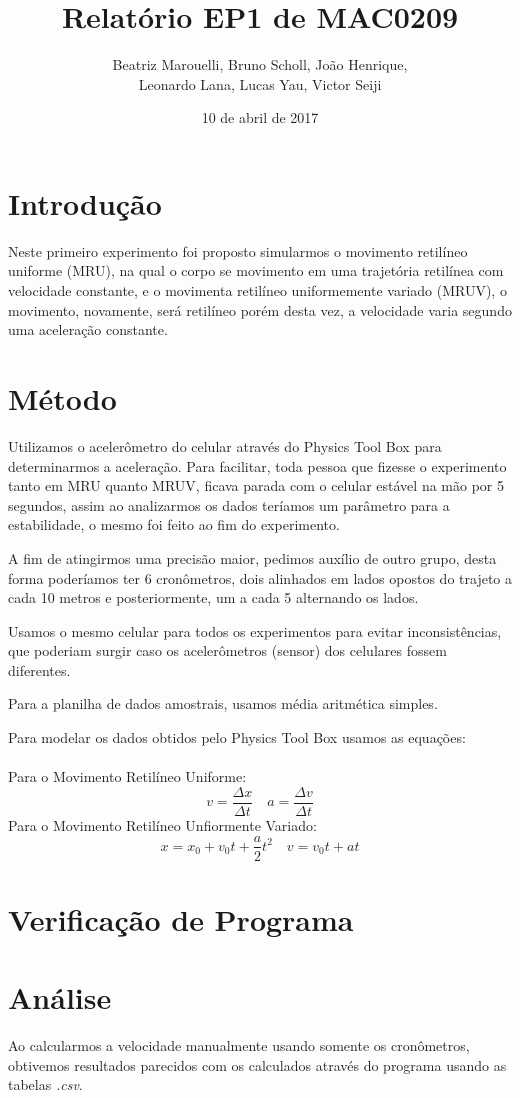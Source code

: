 \documentclass[a4paper, 12pt]{article}
\title{Relatório EP1 de MAC0209}
\author{Beatriz Marouelli, Bruno Scholl, João Henrique, 
\\ Leonardo Lana, Lucas Yau, Victor Seiji}
\date{10 de abril de 2017}
\begin{document}
\maketitle

\section*{Introdução}
Neste primeiro experimento foi proposto simularmos o movimento retilíneo
uniforme (MRU), na qual o corpo se movimento em uma trajetória retilínea com
velocidade constante, e o movimenta retilíneo uniformemente variado (MRUV),
o movimento, novamente, será retilíneo porém desta vez, a velocidade varia
segundo uma aceleração constante.

\section*{Método}
Utilizamos o acelerômetro do celular através do Physics Tool Box para
determinarmos a aceleração. Para facilitar, toda pessoa que fizesse o experimento 
tanto em MRU quanto MRUV, ficava parada com o celular estável na mão por 5 segundos, 
assim ao analizarmos os dados teríamos um parâmetro para a estabilidade, o mesmo 
foi feito ao fim do experimento.

A fim de atingirmos uma precisão maior, pedimos auxílio de outro grupo, desta
forma poderíamos ter 6 cronômetros, dois alinhados em lados opostos do trajeto
a cada 10 metros e posteriormente, um a cada 5 alternando os lados.

Usamos o mesmo celular para todos os experimentos para evitar inconsistências,
que poderiam surgir caso os acelerômetros (sensor) dos celulares fossem diferentes.

Para a planilha de dados amostrais, usamos média aritmética simples.

Para modelar os dados obtidos pelo Physics Tool Box usamos as equações: \\
\\
Para o Movimento Retilíneo Uniforme:
$$v = \frac{\Delta x}{\Delta t} \quad a = \frac{\Delta v}{\Delta t}$$
Para o Movimento Retilíneo Unfiormente Variado:
$$x = x_0 + v_0 t + \frac{a}{2} t^2 \quad v = v_0 t + at$$

\section*{Verificação de Programa}

\section*{Análise}
Ao calcularmos a velocidade manualmente usando somente os cronômetros,
obtivemos resultados parecidos com os calculados através do programa usando as
tabelas \textit{.csv}.
\end{document}
